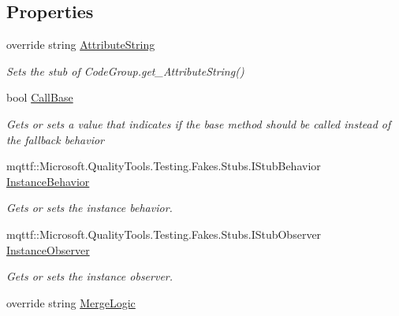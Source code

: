\subsection*{Properties}
\begin{DoxyCompactItemize}
\item 
override string \hyperlink{class_system_1_1_security_1_1_policy_1_1_fakes_1_1_stub_code_group_a62e8b0178f1f9d1cfc53830684c8f287}{Attribute\-String}
\begin{DoxyCompactList}\small\item\em Sets the stub of Code\-Group.\-get\-\_\-\-Attribute\-String()\end{DoxyCompactList}\item 
bool \hyperlink{class_system_1_1_security_1_1_policy_1_1_fakes_1_1_stub_code_group_aad1cff130eef9e7783a7e8b6aec1e415}{Call\-Base}
\begin{DoxyCompactList}\small\item\em Gets or sets a value that indicates if the base method should be called instead of the fallback behavior\end{DoxyCompactList}\item 
mqttf\-::\-Microsoft.\-Quality\-Tools.\-Testing.\-Fakes.\-Stubs.\-I\-Stub\-Behavior \hyperlink{class_system_1_1_security_1_1_policy_1_1_fakes_1_1_stub_code_group_a03cd05acfab09a6f9df9e2e2f90ce315}{Instance\-Behavior}
\begin{DoxyCompactList}\small\item\em Gets or sets the instance behavior.\end{DoxyCompactList}\item 
mqttf\-::\-Microsoft.\-Quality\-Tools.\-Testing.\-Fakes.\-Stubs.\-I\-Stub\-Observer \hyperlink{class_system_1_1_security_1_1_policy_1_1_fakes_1_1_stub_code_group_a6e5fa15cd0eb4ce5a06498ed6ed9b2df}{Instance\-Observer}
\begin{DoxyCompactList}\small\item\em Gets or sets the instance observer.\end{DoxyCompactList}\item 
override string \hyperlink{class_system_1_1_security_1_1_policy_1_1_fakes_1_1_stub_code_group_ae46be593e6687d6048c5f6152e5b4a6f}{Merge\-Logic}

\end{DoxyCompactItemize}
